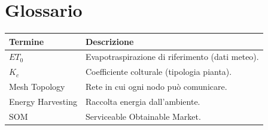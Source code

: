 \documentclass[11pt,a4paper]{report}
\begin{document}
\section{Glossario}
\begin{longtable}{|L{2cm}|L{7cm}|}
\hline
{\bf Termine} & {\bf Descrizione} \\ \hline
$ET_0$ & Evapotraspirazione di riferimento (dati meteo). \\
$K_c$ & Coefficiente colturale (tipologia pianta). \\
Mesh Topology & Rete in cui ogni nodo può comunicare. \\
Energy Harvesting & Raccolta energia dall'ambiente. \\
SOM & Serviceable Obtainable Market. \\ \hline
\end{longtable}
\end{document}
